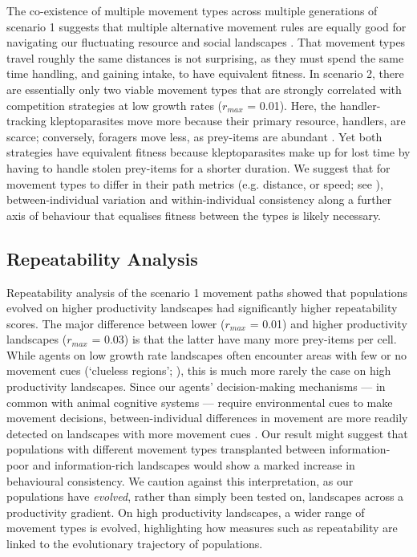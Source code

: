     The co-existence of multiple movement types across multiple generations of scenario 1 suggests that multiple alternative movement rules are equally good for navigating our fluctuating resource and social landscapes \citep[see also][]{getz2015,netz2020}.
    That movement types travel roughly the same distances is not surprising, as they must spend the same time handling, and gaining intake, to have equivalent fitness.
    In scenario 2, there are essentially only two viable movement types that are strongly correlated with competition strategies at low growth rates ($r_{max}$ = 0.01).
    Here, the handler-tracking kleptoparasites move more because their primary resource, handlers, are scarce; conversely, foragers move less, as prey-items are abundant \citep[see][]{gupte2021a}.
    Yet both strategies have equivalent fitness because kleptoparasites make up for lost time by having to handle stolen prey-items for a shorter duration.
    We suggest that for movement types to differ in their path metrics (e.g. distance, or speed; see \citealt{abrahms2017}), between-individual variation and within-individual consistency along a further axis of behaviour that equalises fitness between the types is likely necessary.
    
    \subsection*{Repeatability Analysis}
    
    Repeatability analysis of the scenario 1 movement paths showed that populations evolved on higher productivity landscapes had significantly higher repeatability scores.
    The major difference between lower ($r_{max}$ = 0.01) and higher productivity landscapes ($r_{max}$ = 0.03) is that the latter have many more prey-items per cell.
    While agents on low growth rate landscapes often encounter areas with few or no movement cues (`clueless regions'; \citealt{perkins1992}), this is much more rarely the case on high productivity landscapes.
    Since our agents' decision-making mechanisms --- in common with animal cognitive systems --- require environmental cues to make movement decisions, between-individual differences in movement are more readily detected on landscapes with more movement cues \citep[see][]{carter2013a}.
    Our result might suggest that populations with different movement types transplanted between information-poor and information-rich landscapes would show a marked increase in behavioural consistency.
    We caution against this interpretation, as our populations have \textit{evolved}, rather than simply been tested on, landscapes across a productivity gradient.
    On high productivity landscapes, a wider range of movement types is evolved, highlighting how measures such as repeatability are linked to the evolutionary trajectory of populations.
    
